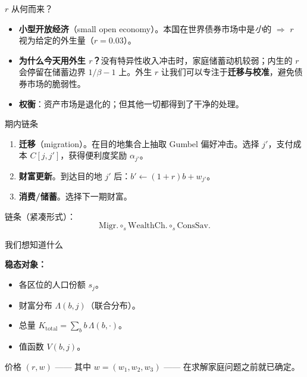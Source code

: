 \documentclass[10pt,aspectratio=169]{beamer}
\newcommand{\circs}{\mathbin{\circ_s}}
\begin{document}
\begin{frame}{$r$ 从何而来？}

\begin{itemize}
  \item \textbf{小型开放经济}（small open economy）。本国在世界债券市场中是\emph{小}的 $\Rightarrow$ $r$ 视为给定的外生量（$r = 0.03$）。
  \item \textbf{为什么今天用外生 $r$？}没有特异性收入冲击时，家庭储蓄动机较弱；内生的 $r$ 会停留在储蓄边界 $1/\beta - 1$ 上。外生 $r$ 让我们可以专注于\textbf{迁移与校准}，避免债券市场的脆弱性。
  \item \textbf{权衡}：资产市场是退化的；但其他一切都得到了干净的处理。
\end{itemize}

\end{frame}

\begin{frame}{期内链条}

\begin{enumerate}
  \item \textbf{迁移}（migration）。在目的地集合上抽取 Gumbel 偏好冲击。选择 $j'$，支付成本 $C[j, j']$，获得便利度奖励 $\alpha_{j'}$。
  \item \textbf{财富更新}。到达目的地 $j'$ 后：$b' \gets (1 + r) b + w_{j'}$。
  \item \textbf{消费/储蓄}。选择下一期财富。
\end{enumerate}

\vspace{0.5em}

链条（紧凑形式）：
\[
\text{Migr.} \circs \text{WealthCh.} \circs \text{ConsSav.}
\]

\end{frame}

\begin{frame}{我们想知道什么}

\textbf{稳态对象：}

\begin{itemize}
  \item 各区位的人口份额 $s_j$。
  \item 财富分布 $\Lambda(b, j)$（联合分布）。
  \item 总量 $K_{\text{total}} = \sum_b b\, \Lambda(b, \cdot)$。
  \item 值函数 $V(b, j)$。
\end{itemize}

\vspace{0.3em}

价格 $(r, w)$ —— 其中 $w = (w_1, w_2, w_3)$ —— 在求解家庭问题之前就已确定。

\end{frame}
\end{document}
